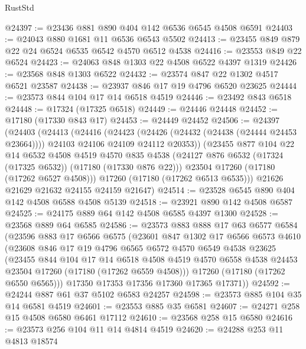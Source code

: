 \begin{lexlean}{RustStd}
\begin{coremodule}
@24397 := @23436 @881 @890 @404 @142 @6536 @6545 @4508 @6591
@24403 := @24043 @880 @1681 @11 @6536 @6543 @5502
@24413 := @23455 @849 @879 @22 @24 @6524 @6535 @6542 @4570 @6512 @4538
@24416 := @23553 @849 @22 @6524
@24423 := @24063 @848 @1303 @22 @4508 @6522 @4397 @1319
@24426 := @23568 @848 @1303 @6522
@24432 := @23574 @847 @22 @1302 @4517 @6521 @23587
@24438 := @23937 @846 @17 @19 @4796 @6520 @23625
@24444 := @23573 @844 @104 @17 @14 @6518 @4519
@24446 := @23492 @843 @6518
@24448 := @17324 (@17325 @6518)
@24449 := @24446 @24448
@24452 := @17180 (@17330 @843 @17)
@24453 := @24449 @24452
@24506 := @24397
    (@24403
      (@24413
        (@24416
          (@24423
            (@24426 (@24432 (@24438 (@24444 @24453 @23664))))
            @24103
            @24106
            @24109
            @24112
            @20353))
        (@23455
          @877
          @104
          @22
          @14
          @6532
          @4508
          @4519
          @4570
          @835
          @4538
          (@24127 @876 @6532 (@17324 (@17325 @6532)) (@17180 (@17330 @876 @22)))
          @23504
          @17260
          (@17180 (@17262 @6527 @4508)))
        @17260
        (@17180 (@17262 @6513 @6535)))
      @21626
      @21629
      @21632
      @24155
      @24159
      @21647)
@24514 := @23528 @6545 @890 @404 @142 @4508 @6588 @4508 @5139
@24518 := @23921 @890 @142 @4508 @6587
@24525 := @24175 @889 @64 @142 @4508 @6585 @4397 @1300
@24528 := @23568 @889 @64 @6585
@24586 := @23573
    @883
    @888
    @17
    @63
    @6577
    @6584
    (@23596
      @883
      @17
      @6566
      @6575
      (@23601
        @847
        @1302
        @17
        @6566
        @6573
        @4610
        (@23608
          @846
          @17
          @19
          @4796
          @6565
          @6572
          @4570
          @6549
          @4538
          @23625
          (@23455
            @844
            @104
            @17
            @14
            @6518
            @4508
            @4519
            @4570
            @6558
            @4538
            @24453
            @23504
            @17260
            (@17180 (@17262 @6559 @4508)))
          @17260
          (@17180 (@17262 @6550 @6565)))
        @17350
        @17353
        @17356
        @17360
        @17365
        @17371))
@24592 := @24244 @887 @61 @37 @5102 @6583 @24257
@24598 := @23573 @885 @104 @35 @14 @6581 @4519
@24601 := @23553 @885 @35 @6581
@24607 := @24271 @258 @15 @4508 @6580 @6461 @17112
@24610 := @23568 @258 @15 @6580
@24616 := @23573 @256 @104 @11 @14 @4814 @4519
@24620 := @24288 @253 @11 @4813 @18574

\end{coremodule}
\end{lexlean}
